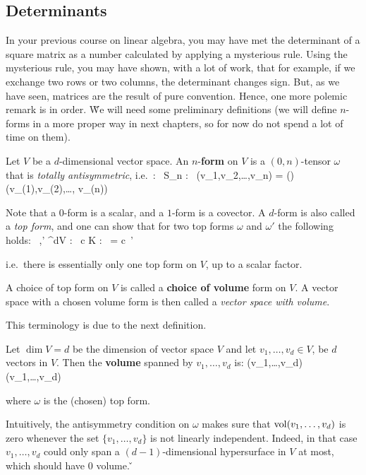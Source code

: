 \subsection{Determinants}

In your previous course on linear algebra, you may have met the determinant of a square matrix as a number calculated
by applying a mysterious rule. Using the mysterious rule, you may have shown, with a lot of work, that for example,
if we exchange two rows or two columns, the determinant changes sign. But, as we have seen, matrices are the result
of pure convention. Hence, one more polemic remark is in order. \v

We will need some preliminary definitions (we will define $n$-forms in a more proper way in next chapters, so for now
do not spend a lot of time on them).

Let $V$ be a $d$-dimensional vector space. An $n$-\textbf{form} on $V$ is a $(0,n)$-tensor $\omega$ that is
\emph{totally antisymmetric}, i.e.\ :
\bse
\forall \, \pi \in S_n : \ \omega(v_1,v_2,\ldots,v_n)
= (\pi)\, \omega(v_{\pi(1)},v_{\pi(2)},\ldots, v_{\pi(n)})
\ese
\ed

Note that a $0$-form is a scalar, and a $1$-form is a covector. A $d$-form is also called a \emph{top form}, and one
can show that for two top forms $\omega$ and $\omega'$ the following holds:
\bse
\forall \, \omega,\omega' \in \Lambda^dV : \exists \, c \in K : \ \omega = c\, \omega'
\ese

i.e.\ there is essentially only one top form on $V$, up to a scalar factor.

A choice of top form on $V$ is called a \textbf{choice of volume} form on $V$. A vector space with a chosen volume
form is then called a \emph{vector space with volume}.
\ed

This terminology is due to the next definition.

\bd [Volume]
Let $\dim V = d$ be the dimension of vector space $V$ and let $v_1,\ldots, v_d\in V$, be $d$ vectors in $V$. Then the
\textbf{volume} spanned by $v_1,\ldots,v_d$ is:
\bse
\vol(v_1,\ldots,v_d) \coloneqq \omega(v_1,\ldots,v_d)
\ese

where $\omega$ is the (chosen) top form.
\ed

Intuitively, the antisymmetry condition on $\omega$ makes sure that $\operatorname{vol} (v_1,\ldots,v_d)$ is zero whenever the set
$\{v_1,\ldots,v_d\}$ is not linearly independent. Indeed, in that case $v_1, \ldots,v_d$ could only span a $(d-1)
$-dimensional hypersurface in $V$ at most, which should have $0$ volume. \v

